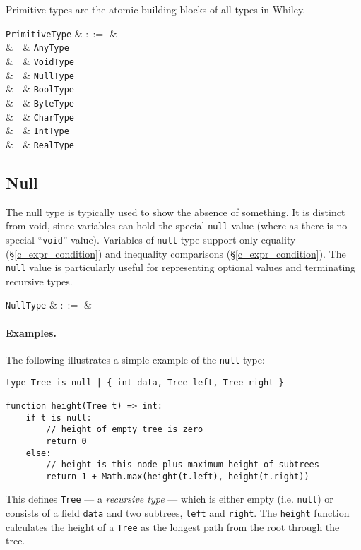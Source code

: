 Primitive types are the atomic building blocks of all types in Whiley.  

\begin{syntax}
  \verb+PrimitiveType+ & $::=$ & \\
  & $|$ & \verb+AnyType+ \\
  & $|$ & \verb+VoidType+ \\
  & $|$ & \verb+NullType+ \\
  & $|$ & \verb+BoolType+ \\
  & $|$ & \verb+ByteType+ \\
  & $|$ & \verb+CharType+ \\
  & $|$ & \verb+IntType+ \\
  & $|$ & \verb+RealType+ \\
\end{syntax}


\subsection{Null}
\label{c_types_null}

The null type is typically used to show the absence of something. It is distinct from void, since variables can hold the special \lstinline{null} value (where as there is no special ``\lstinline{void}'' value).  Variables of \lstinline{null} type support only equality (\S\ref{c_expr_condition}) and inequality comparisons (\S\ref{c_expr_condition}).  The \lstinline{null} value is particularly useful for representing optional values and terminating recursive types.

\begin{syntax}
  \verb+NullType+ & $::=$ &  \\
\end{syntax}

\paragraph{Examples.}  The following illustrates a simple example of the \lstinline{null} type:

\begin{lstlisting}
type Tree is null | { int data, Tree left, Tree right }

function height(Tree t) => int:
    if t is null:
        // height of empty tree is zero
        return 0
    else:
        // height is this node plus maximum height of subtrees
        return 1 + Math.max(height(t.left), height(t.right))
\end{lstlisting}
This defines \lstinline{Tree} --- a {\em recursive type} --- which is either empty (i.e. \lstinline{null}) or consists of a field \lstinline{data} and two subtrees, \lstinline{left} and \lstinline{right}.  The \lstinline{height} function calculates the height of a \lstinline{Tree} as the longest path from the root through the tree.

